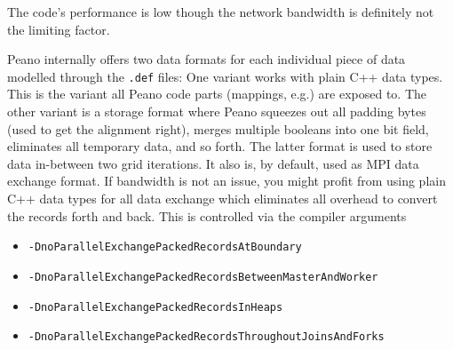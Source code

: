 \begin{smell}
 The code's performance is low though the network bandwidth is definitely not
 the limiting factor.
\end{smell}


Peano internally offers two data formats for each individual piece of data
modelled through the \texttt{.def} files:
One variant works with plain C++ data types. 
This is the variant all Peano code parts (mappings, e.g.) are exposed to.
The other variant is a  storage format where Peano squeezes out
all padding bytes (used to get the alignment right), merges multiple booleans
into one bit field, eliminates all temporary data, and so forth.
The latter format is used to store data in-between two grid iterations.
It also is, by default, used as MPI data exchange format.
If bandwidth is not an issue, you might profit from using plain C++ data types
for all data exchange which eliminates all overhead to convert the records forth
and back.
This is controlled via the compiler arguments

\begin{itemize}
  \item \texttt{-DnoParallelExchangePackedRecordsAtBoundary}
  \item \texttt{-DnoParallelExchangePackedRecordsBetweenMasterAndWorker}
  \item \texttt{-DnoParallelExchangePackedRecordsInHeaps}
  \item \texttt{-DnoParallelExchangePackedRecordsThroughoutJoinsAndForks}
\end{itemize}


%



% 
% 

